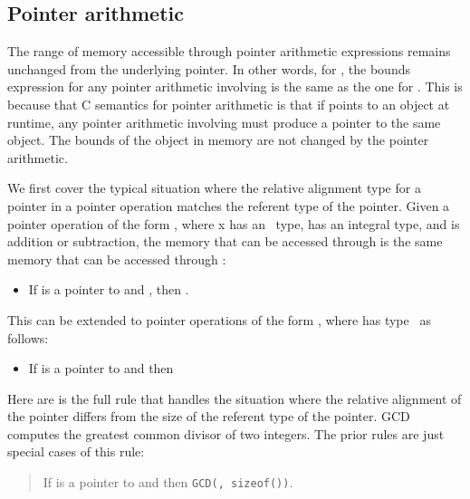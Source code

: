 \subsection{Pointer arithmetic}

The range of memory accessible through pointer arithmetic expressions
remains unchanged from the underlying pointer. In other words, for
, the bounds expression for any
pointer arithmetic involving  is the same as the one for
. This is because that C semantics for pointer arithmetic is
that if  points to an object at runtime, any pointer arithmetic
involving  must produce a pointer to the same object. The bounds
of the object in memory are not changed by the pointer arithmetic.

We first cover the typical situation where the relative alignment type
for a pointer in a pointer operation matches the referent type of the
pointer. Given a pointer operation of the form , where x
has an \arrayptr\ type,  has an integral type, and
 is addition or subtraction, the memory that can be accessed
through  is the same memory that can be accessed through
:

\begin{itemize}
\item
  If  is a pointer to  and 
  ,
  then .
\end{itemize}

This can be extended to pointer operations of the form ,
where  has type
\arrayptrT\ as
follows:

\begin{itemize}
\item
  If  is a pointer to  and 
  then 
\end{itemize}

Here are is the full rule that handles the situation where the relative
alignment of the pointer differs from the size of the referent type of
the pointer. GCD computes the greatest common divisor of two integers.
The prior rules are just special cases of this rule:

\begin{quote}
If  is a pointer to  and 
            {
                       {}
                       {}}
then 
                 {
                            {}
                            {\texttt{GCD(, sizeof())}}}.
\end{quote}

